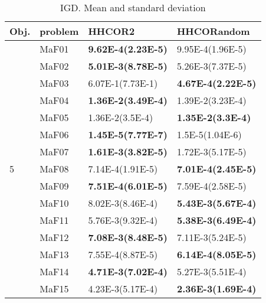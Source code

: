 \documentclass[]{article}
\begin{document}
\begin{table}
\caption{IGD. Mean and standard deviation}
\label{table:mean.IGD}
\centering
\begin{footnotesize}
\begin{tabular}{|l|l|l|l|}
\hline
Obj. & problem  & HHCOR2 & HHCORandom \\ \hline

\multirow{15}{*}{5} & MaF01 & \cellcolor{gray95} {\bf 9.62E-4(2.23E-5)} & 9.95E-4(1.96E-5)\\
 & MaF02 & \cellcolor{gray95} {\bf 5.01E-3(8.78E-5)} & 5.26E-3(7.37E-5)\\
 & MaF03 & 6.07E-1(7.73E-1) & \cellcolor{gray95} {\bf 4.67E-4(2.22E-5)}\\
 & MaF04 & \cellcolor{gray95} {\bf 1.36E-2(3.49E-4)} & 1.39E-2(3.23E-4)\\
 & MaF05 & \cellcolor{gray95} 1.36E-2(3.5E-4) & \cellcolor{gray95} {\bf 1.35E-2(3.3E-4)}\\
 & MaF06 & \cellcolor{gray95} {\bf 1.45E-5(7.77E-7)} & \cellcolor{gray95} 1.5E-5(1.04E-6)\\
 & MaF07 & \cellcolor{gray95} {\bf 1.61E-3(3.82E-5)} & 1.72E-3(5.17E-5)\\
 & MaF08 & 7.14E-4(1.91E-5) & \cellcolor{gray95} {\bf 7.01E-4(2.45E-5)}\\
 & MaF09 & \cellcolor{gray95} {\bf 7.51E-4(6.01E-5)} & 7.59E-4(2.58E-5)\\
 & MaF10 & 8.02E-3(8.46E-4) & \cellcolor{gray95} {\bf 5.43E-3(5.67E-4)}\\
 & MaF11 & \cellcolor{gray95} 5.76E-3(9.32E-4) & \cellcolor{gray95} {\bf 5.38E-3(6.49E-4)}\\
 & MaF12 & \cellcolor{gray95} {\bf 7.08E-3(8.48E-5)} & \cellcolor{gray95} 7.11E-3(5.24E-5)\\
 & MaF13 & 7.55E-4(8.87E-5) & \cellcolor{gray95} {\bf 6.14E-4(8.05E-5)}\\
 & MaF14 & \cellcolor{gray95} {\bf 4.71E-3(7.02E-4)} & 5.27E-3(5.51E-4)\\
 & MaF15 & 4.23E-3(5.17E-4) & \cellcolor{gray95} {\bf 2.36E-3(1.69E-4)}\\
\hline


\end{tabular}
\end{footnotesize}
\end{table}
\end{document}
